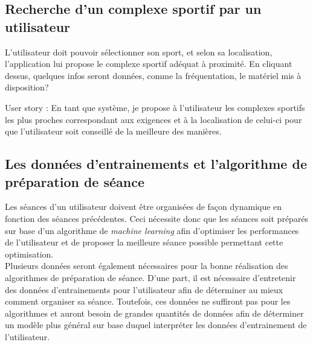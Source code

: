 \subsection*{Recherche d'un complexe sportif par un utilisateur}

L'utilisateur doit pouvoir sélectionner son sport, et selon sa localisation, l'application lui propose le complexe sportif adéquat à proximité. En cliquant dessus, quelques infos seront données, comme la fréquentation, le matériel mis à disposition?\\

\begin{itshape}
User story : En tant que système, je propose à l'utilisateur les complexes sportifs les plus proches correspondant aux exigences et à la localisation de celui-ci pour que l'utilisateur soit conseillé de la meilleure des manières.

\end{itshape}


\subsection*{Les données d'entrainements et l'algorithme de préparation de séance}

Les séances d'un utilisateur doivent être organisées de façon dynamique en fonction des séances précédentes. Ceci nécessite donc que les séances soit préparés sur base d'un algorithme de \textit{machine learning} afin d'optimiser les performances de l'utilisateur et de proposer la meilleure séance possible permettant cette optimisation.\\

Plusieurs données seront également nécessaires pour la bonne réalisation des algorithmes de préparation de séance. D'une part, il est nécessaire d'entretenir des données d'entrainements pour l'utilisateur afin de déterminer au mieux comment organiser sa séance. Toutefois, ces données ne suffiront pas pour les algorithmes et auront besoin de grandes quantités de données afin de déterminer un modèle plus général sur base duquel interpréter les données d'entrainement de l'utilisateur.  